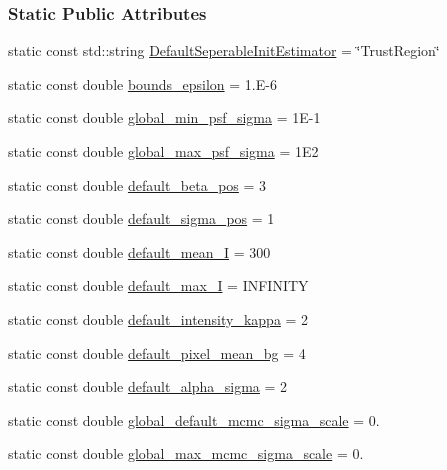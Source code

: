 \subsubsection*{Static Public Attributes}
\begin{DoxyCompactItemize}
\item 
static const std\+::string \hyperlink{classmappel_1_1PointEmitterModel_ad8c3dc629d75d22f25855a5f1ba8729f}{Default\+Seperable\+Init\+Estimator} = \char`\"{}Trust\+Region\char`\"{}
\item 
static const double \hyperlink{classmappel_1_1PointEmitterModel_ac987a119137b85a27704b1c40e3fab8c}{bounds\+\_\+epsilon} = 1.\+E-\/6
\item 
static const double \hyperlink{classmappel_1_1PointEmitterModel_a77d0ca98d77cb8b94117ece2a5b182a4}{global\+\_\+min\+\_\+psf\+\_\+sigma} = 1\+E-\/1
\item 
static const double \hyperlink{classmappel_1_1PointEmitterModel_a5e79dba8966c25c4e9c675cd1a2cab70}{global\+\_\+max\+\_\+psf\+\_\+sigma} = 1\+E2
\item 
static const double \hyperlink{classmappel_1_1PointEmitterModel_a9b64c3b4b97ac2805340c0779c71398c}{default\+\_\+beta\+\_\+pos} = 3
\item 
static const double \hyperlink{classmappel_1_1PointEmitterModel_aa98a73b9e3937c00b07596d3928df3ca}{default\+\_\+sigma\+\_\+pos} = 1
\item 
static const double \hyperlink{classmappel_1_1PointEmitterModel_a575dd30a0afb886db82ac725c8cc8df3}{default\+\_\+mean\+\_\+I} = 300
\item 
static const double \hyperlink{classmappel_1_1PointEmitterModel_acca80757a9a285a9e6eedea167d038c7}{default\+\_\+max\+\_\+I} = I\+N\+F\+I\+N\+I\+TY
\item 
static const double \hyperlink{classmappel_1_1PointEmitterModel_ad1f21ed3be543deed3c78a0494cb2984}{default\+\_\+intensity\+\_\+kappa} = 2
\item 
static const double \hyperlink{classmappel_1_1PointEmitterModel_abe82d75be8586234657a61e2f137a6c8}{default\+\_\+pixel\+\_\+mean\+\_\+bg} = 4
\item 
static const double \hyperlink{classmappel_1_1PointEmitterModel_a0d9f2c5438940f329e75708987e8b343}{default\+\_\+alpha\+\_\+sigma} = 2
\item 
static const double \hyperlink{classmappel_1_1MCMCAdaptorBase_a44cebca0e27135c854fa8430d2d89929}{global\+\_\+default\+\_\+mcmc\+\_\+sigma\+\_\+scale} = 0.
\item 
static const double \hyperlink{classmappel_1_1MCMCAdaptorBase_aebc93881ca351e67de867238a62579eb}{global\+\_\+max\+\_\+mcmc\+\_\+sigma\+\_\+scale} = 0.
\end{DoxyCompactItemize}

